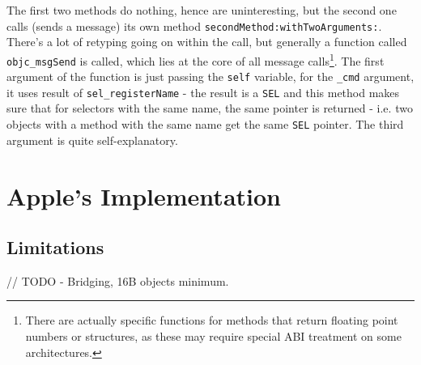 \documentclass[a4paper, 11pt, fleqn]{book}
\begin{document}
The first two methods do nothing, hence are uninteresting, but the second one calls (sends a message) its own method \verb=secondMethod:withTwoArguments:=. There's a lot of retyping going on within the call, but generally a function called \verb=objc_msgSend= is called, which lies at the core of all message calls\footnote{There are actually specific functions for methods that return floating point numbers or structures, as these may require special ABI treatment on some architectures.}. The first argument of the function is just passing the \verb=self= variable, for the \verb=_cmd= argument, it uses result of \verb=sel_registerName= - the result is a \verb=SEL= and this method makes sure that for selectors with the same name, the same pointer is returned - i.e. two objects with a method with the same name get the same \verb=SEL= pointer. The third argument is quite self-explanatory.


\chapter{Apple's Implementation}
\section{Limitations}
// TODO
- Bridging, 16B objects minimum.
\end{document}
